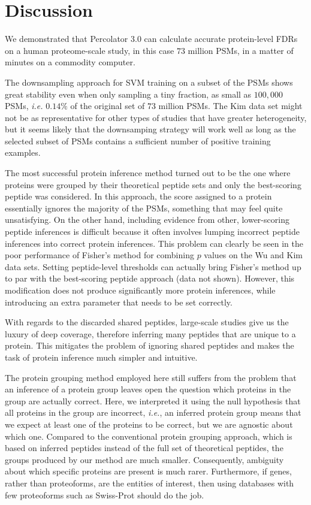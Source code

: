 \documentclass{article}
\begin{document}
\section*{Discussion}

We demonstrated that Percolator 3.0 can calculate accurate
protein-level FDRs on a human proteome-scale study, in this case $73$
million PSMs, in a matter of minutes on a commodity computer.

The downsampling approach for SVM training on a subset of the PSMs 
shows great stability even when only sampling a tiny fraction, as 
small as $100,000$ PSMs, {\em i.e.} $0.14\%$ of the original set of 
$73$ million PSMs.  The Kim data set might not be as representative 
for other types of studies that have greater heterogeneity, but it 
seems likely that the downsamping strategy will work well as long as 
the selected subset of PSMs contains a sufficient number of positive 
training examples.

The most successful protein inference method turned out to be the one
where proteins were grouped by their theoretical peptide sets and only
the best-scoring peptide was considered. In this approach, the score
assigned to a protein essentially ignores the majority of the PSMs,
something that may feel quite unsatisfying. On the other hand,
including evidence from other, lower-scoring peptide inferences is
difficult because it often involves lumping incorrect peptide
inferences into correct protein inferences.  This problem can clearly
be seen in the poor performance of Fisher's method for combining $p$
values on the Wu and Kim data sets. Setting peptide-level thresholds
can actually bring Fisher's method up to par with the best-scoring
peptide approach (data not shown). However, this modification does not
produce significantly more protein inferences, while introducing an
extra parameter that needs to be set correctly.

With regards to the discarded shared peptides, large-scale studies
give us the luxury of deep coverage, therefore inferring many
peptides that are unique to a protein. This mitigates the problem of
ignoring shared peptides and makes the task of protein inference much
simpler and intuitive.

The protein grouping method employed here still suffers from the
problem that an inference of a protein group leaves open the
question which proteins in the group are actually correct. Here, we
interpreted it using the null hypothesis that all proteins in the
group are incorrect, {\em i.e.}, an inferred protein group means
that we expect at least one of the proteins to be correct, but we are
agnostic about which one. Compared to the conventional protein
grouping approach, which is based on inferred peptides instead of
the full set of theoretical peptides, the groups produced by our
method are much smaller.  Consequently, ambiguity about which specific
proteins are present is much rarer.  Furthermore, if genes, rather
than proteoforms, are the entities of interest, then using databases
with few proteoforms such as Swiss-Prot should do the job.
\end{document}
